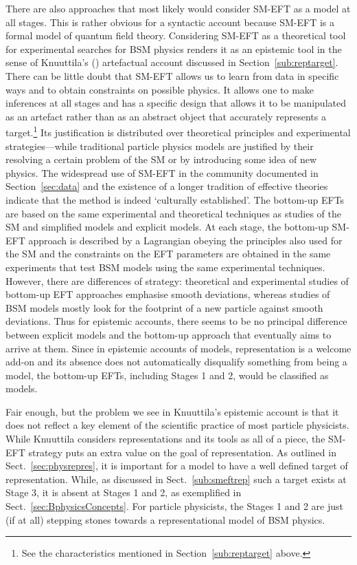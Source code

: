 There are also approaches that most likely would consider SM-EFT as a model at all stages. 
This is rather obvious for a syntactic account because SM-EFT is a formal model of quantum field theory. 
Considering SM-EFT as a theoretical tool for experimental searches for BSM physics renders it as an epistemic tool in the sense of Knuuttila's (\citeyear{knuuttila2011,Knuuttila2017}) artefactual account discussed in Section~\ref{sub:reptarget}.  
There can be little doubt that SM-EFT allows us to learn from data in specific ways and to obtain constraints on possible physics.
It allows one to make inferences at all stages and has a specific design that allows it to be manipulated as an artefact rather than as an abstract object that accurately represents a target.\footnote{See the characteristics mentioned in Section~\ref{sub:reptarget} above.} 
Its justification is distributed over theoretical principles and experimental strategies---while traditional particle physics models are justified by their resolving a certain problem of the SM or by introducing some idea of new physics.
The widespread use of SM-EFT in the community documented in Section~\ref{sec:data} and the existence of a longer tradition of effective theories \citep{wells2011} indicate that the method is indeed `culturally established'. 
The bottom-up EFTs are based on the same experimental and theoretical techniques as studies of the SM and simplified models and explicit models. 
At each stage, the bottom-up SM-EFT approach is described by a Lagrangian 
obeying the principles also used for the SM and the constraints on the EFT parameters are obtained in the same experiments that test BSM models using the same experimental techniques. 
However, there are differences of strategy: theoretical and experimental studies of bottom-up EFT approaches emphasise smooth deviations, whereas studies of BSM models mostly look for the footprint of a new particle against smooth deviations.
Thus for epistemic accounts, there seems to be no principal difference between explicit models and the bottom-up approach that eventually aims to arrive at them. 
Since in epistemic accounts of models, representation is a welcome add-on and its absence does not automatically disqualify something from being a model, the bottom-up EFTs, including Stages 1 and 2, would be classified as models.


Fair enough, but the problem we see in Knuuttila's epistemic account is that it does not reflect a key element of the scientific practice of most particle physicists. 
While Knuuttila considers representations and its tools as all of a piece, the SM-EFT strategy puts an extra value on the goal of representation. 
As outlined in Sect.~\ref{sec:physrepres}, it is important for a model to have a well defined target of representation. 
While, as discussed in Sect.~\ref{sub:smeftrep} such a target exists at Stage 3, it is absent at Stages 1 and 2, as exemplified in Sect.~\ref{sec:BphysicsConcepts}. 
For particle physicists, the Stages 1 and 2 are just (if at all) stepping stones towards a representational model of BSM physics.

